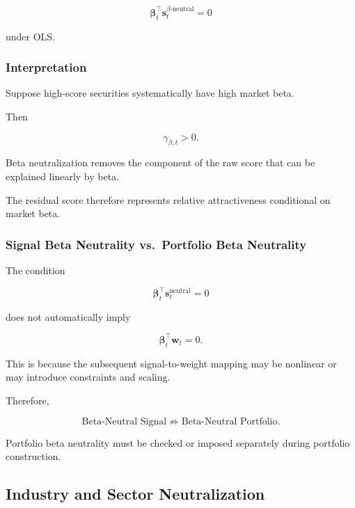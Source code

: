 \documentclass[11pt,a4paper]{article}
\begin{document}
\begin{equation}
\boldsymbol{\beta}_t^\top
\mathbf{s}_t^{\beta\text{-neutral}}
=
0
\end{equation}

under OLS.


\subsubsection{Interpretation}

Suppose high-score securities systematically have high market beta.

Then

\begin{equation}
\gamma_{\beta,t}>0.
\end{equation}

Beta neutralization removes the component of the raw score that can be
explained linearly by beta.

The residual score therefore represents relative attractiveness conditional on
market beta.


\subsubsection{Signal Beta Neutrality vs.\ Portfolio Beta Neutrality}

The condition

\begin{equation}
\boldsymbol{\beta}_t^\top
\mathbf{s}_t^{\mathrm{neutral}}
=
0
\end{equation}

does not automatically imply

\begin{equation}
\boldsymbol{\beta}_t^\top
\mathbf{w}_t
=
0.
\end{equation}

This is because the subsequent signal-to-weight mapping may be nonlinear or may
introduce constraints and scaling.

Therefore,

\begin{equation}
\boxed{
\text{Beta-Neutral Signal}
\not\Rightarrow
\text{Beta-Neutral Portfolio}.
}
\end{equation}

Portfolio beta neutrality must be checked or imposed separately during
portfolio construction.


\subsection{Industry and Sector Neutralization}
\label{subsec:industry_neutralization}
\end{document}
